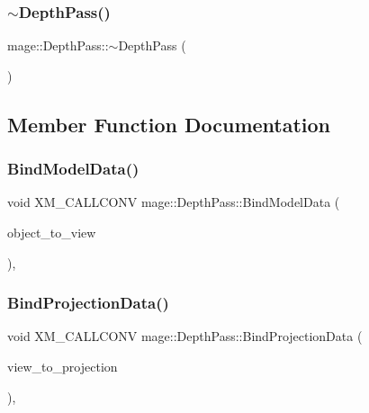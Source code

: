 \hypertarget{classmage_1_1_depth_pass_adc89d5da94b42294316d4ad1dfa09eb4}{}\label{classmage_1_1_depth_pass_adc89d5da94b42294316d4ad1dfa09eb4} 
\subsubsection{\texorpdfstring{$\sim$\+Depth\+Pass()}{~DepthPass()}}
{\footnotesize\ttfamily mage\+::\+Depth\+Pass\+::$\sim$\+Depth\+Pass (\begin{DoxyParamCaption}{ }\end{DoxyParamCaption})\hspace{0.3cm}{\ttfamily [default]}}



\subsection{Member Function Documentation}
\hypertarget{classmage_1_1_depth_pass_ae6662a200915bd6e6842d76f47abd6c4}{}\label{classmage_1_1_depth_pass_ae6662a200915bd6e6842d76f47abd6c4} 
\subsubsection{\texorpdfstring{Bind\+Model\+Data()}{BindModelData()}}
{\footnotesize\ttfamily void X\+M\+\_\+\+C\+A\+L\+L\+C\+O\+NV mage\+::\+Depth\+Pass\+::\+Bind\+Model\+Data (\begin{DoxyParamCaption}\item[{F\+X\+M\+M\+A\+T\+R\+IX}]{object\+\_\+to\+\_\+view }\end{DoxyParamCaption})\hspace{0.3cm}{\ttfamily [private]}, {\ttfamily [noexcept]}}

\hypertarget{classmage_1_1_depth_pass_a38ff8d33518769575a945f4908993eb0}{}\label{classmage_1_1_depth_pass_a38ff8d33518769575a945f4908993eb0} 
\subsubsection{\texorpdfstring{Bind\+Projection\+Data()}{BindProjectionData()}}
{\footnotesize\ttfamily void X\+M\+\_\+\+C\+A\+L\+L\+C\+O\+NV mage\+::\+Depth\+Pass\+::\+Bind\+Projection\+Data (\begin{DoxyParamCaption}\item[{F\+X\+M\+M\+A\+T\+R\+IX}]{view\+\_\+to\+\_\+projection }\end{DoxyParamCaption})\hspace{0.3cm}{\ttfamily [private]}, {\ttfamily [noexcept]}}

